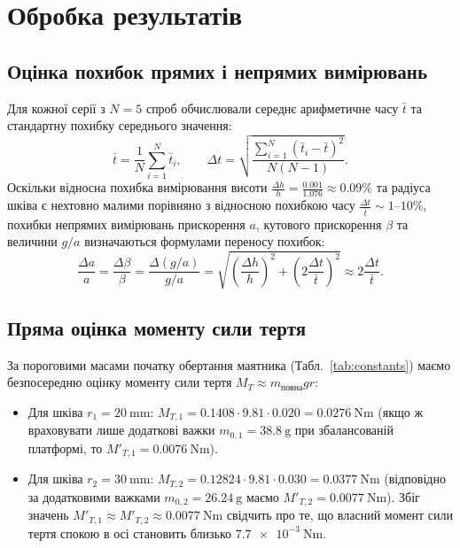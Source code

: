 \documentclass[ukrainian]{ucaphyslab}
\begin{document}
\section{Обробка результатів}

\subsection{Оцінка похибок прямих і непрямих вимірювань}
Для кожної серії з $N = 5$ спроб обчислювали середнє арифметичне часу $\bar{t}$ та стандартну похибку середнього значення:
\begin{equation}
  \bar{t} = \frac{1}{N}\sum_{i=1}^{N} \bar{t}_i, \qquad \Delta t = \sqrt{\frac{\sum_{i=1}^{N}(\bar{t}_i - \bar{t})^2}{N(N-1)}}.
\end{equation}
Оскільки відносна похибка вимірювання висоти $\frac{\Delta h}{h} = \frac{0.001}{1.076} \approx 0.09\%$ та радіуса шківа є нехтовно малими порівняно з відносною похибкою часу $\frac{\Delta t}{\bar{t}} \sim 1\text{--}10\%$, похибки непрямих вимірювань прискорення $a$, кутового прискорення $\beta$ та величини $g/a$ визначаються формулами переносу похибок:
\begin{equation}
  \frac{\Delta a}{a} = \frac{\Delta \beta}{\beta} = \frac{\Delta(g/a)}{g/a} = \sqrt{\left(\frac{\Delta h}{h}\right)^2 + \left(2\frac{\Delta t}{\bar{t}}\right)^2} \approx 2\frac{\Delta t}{\bar{t}}.
\end{equation}

\subsection{Пряма оцінка моменту сили тертя}
За пороговими масами початку обертання маятника (Табл.~\ref{tab:constants}) маємо безпосередню оцінку моменту сили тертя $M_T \approx m_{\text{повна}} g r$:
\begin{itemize}
  \item Для шківа $r_1 = \SI{20}{\milli\meter}$: $M_{T,1} = \num{0.1408} \cdot \num{9.81} \cdot \num{0.020} = \SI{0.0276}{\newton\meter}$ (якщо ж враховувати лише додаткові важки $m_{0,1} = \SI{38.8}{\gram}$ при збалансованій платформі, то $M'_{T,1} = \SI{0.0076}{\newton\meter}$).
  \item Для шківа $r_2 = \SI{30}{\milli\meter}$: $M_{T,2} = \num{0.12824} \cdot \num{9.81} \cdot \num{0.030} = \SI{0.0377}{\newton\meter}$ (відповідно за додатковими важками $m_{0,2} = \SI{26.24}{\gram}$ маємо $M'_{T,2} = \SI{0.0077}{\newton\meter}$). Збіг значень $M'_{T,1} \approx M'_{T,2} \approx \SI{0.0077}{\newton\meter}$ свідчить про те, що власний момент сили тертя спокою в осі становить близько $\SI{7.7e-3}{\newton\meter}$.
\end{itemize}
\end{document}
